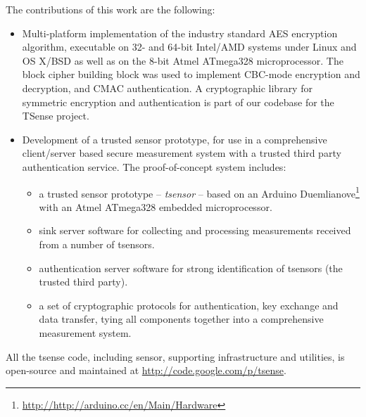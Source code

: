 The contributions of this work are the following:
\begin{itemize}
\item Multi-platform implementation of the industry standard AES encryption algorithm, executable on 32- and 64-bit Intel/AMD systems under Linux and OS X/BSD as well as on the 8-bit Atmel ATmega328 microprocessor. The block cipher building block was used to implement CBC-mode encryption and decryption, and CMAC authentication. A cryptographic library for symmetric encryption and authentication is part of our codebase for the TSense project.
\item Development of a trusted sensor prototype, for use in a comprehensive client/server based secure measurement system with a trusted third party authentication service. The proof-of-concept system includes:
\begin{itemize}
\item a trusted sensor prototype -- \textit{tsensor} -- based on an Arduino Duemlianove\footnote{\url{http://http://arduino.cc/en/Main/Hardware}} with an Atmel ATmega328 embedded microprocessor.
\item sink server software for collecting and processing measurements received from a number of tsensors.
\item authentication server software for strong identification of tsensors (the trusted third party).
\item a set of cryptographic protocols for authentication, key exchange and data transfer, tying all components together into a comprehensive measurement system.
\end{itemize}
\end{itemize}

All the tsense code, including sensor, supporting infrastructure and utilities, is open-source and maintained at \url{http://code.google.com/p/tsense}. 




